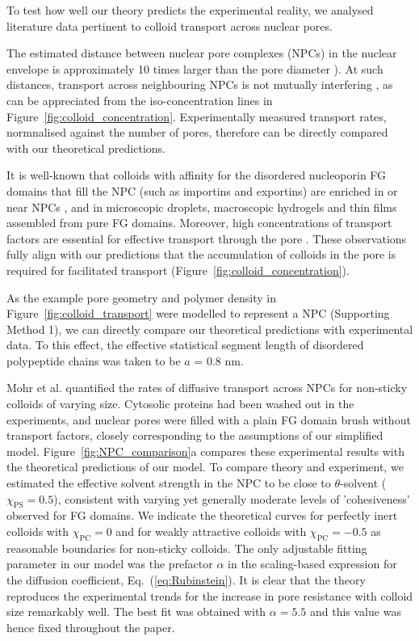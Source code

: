 \documentclass[12pt, a4paper]{article}
\begin{document}
To test how well our theory predicts the experimental reality, we analysed literature data pertinent to colloid transport across nuclear pores.

The estimated distance between nuclear pore complexes (NPCs) in the nuclear envelope is approximately 10 times larger than the pore diameter \cite{Yang2004, Daigle2001, Feldherr1984, Kubitscheck2000}). At such distances, transport across neighbouring NPCs is not mutually interfering \cite{Fabrikant1985}, as can be appreciated from the iso-concentration lines in Figure~\ref{fig:colloid_concentration}. Experimentally measured transport rates, normnalised against the number of pores, therefore can be directly compared with our theoretical predictions.  

It is well-known that colloids with affinity for the disordered nucleoporin FG domains that fill the NPC (such as importins and exportins) are enriched in or near NPCs \cite{Beck2007, Gruenwald2010, Tu2011}, and in microscopic droplets, macroscopic hydrogels and thin films assembled from pure FG domains.
Moreover, high concentrations of transport factors are essential for effective transport through the pore \cite{Lowe2015}.
These observations fully align with our predictions that the accumulation of colloids in the pore is required for facilitated transport (Figure~\ref{fig:colloid_concentration}).

As the example pore geometry and polymer density in Figure~\ref{fig:colloid_transport} were modelled to represent a NPC (Supporting Method 1), we can directly compare our theoretical predictions with experimental data. To this effect, the effective statistical segment length of disordered polypeptide chains was taken to be $a$ = 0.8 nm. 

Mohr et al. \cite{Mohr2009} quantified the rates of diffusive transport across NPCs for non-sticky colloids of varying size.
Cytosolic proteins had been washed out in the experiments, and nuclear pores were filled with a plain FG domain brush without transport factors, closely corresponding to the assumptions of our simplified model.
Figure~\ref{fig:NPC_comparison}a compares these experimental results with the theoretical predictions of our model.
To compare theory and experiment, we estimated the effective solvent strength in the NPC to be close to $\theta$-solvent ($\chi_{\text{PS}} = 0.5$), consistent with varying yet generally moderate levels of 'cohesiveness' observed for FG domains.
We indicate the theoretical curves for perfectly inert colloids with $\chi_{\text{PC}} = 0$ and for weakly attractive colloids with $\chi_{\text{PC}} = -0.5$ as reasonable boundaries for non-sticky colloids. 
The only adjustable fitting parameter in our model was the prefactor $\alpha$ in the scaling-based expression for the diffusion coefficient, Eq.~(\ref{eq:Rubinstein}).
It is clear that the theory reproduces the experimental trends for the increase in pore resistance with colloid size remarkably well.
The best fit was obtained with $\alpha = 5.5$ and this value was hence fixed  throughout the paper.
\end{document}
